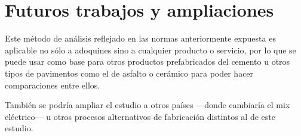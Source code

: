 \section{Futuros trabajos y ampliaciones}

Este método de análisis reflejado en las normas anteriormente expuesta es aplicable no sólo a adoquines sino a cualquier producto o servicio, por lo que se puede usar como base para otros productos prefabricados del cemento u otros tipos de pavimentos como el de asfalto o cerámico para poder hacer comparaciones entre ellos.

También se podría ampliar el estudio a otros países —donde cambiaría el mix eléctrico— u otros procesos alternativos de fabricación distintos al de este estudio.
